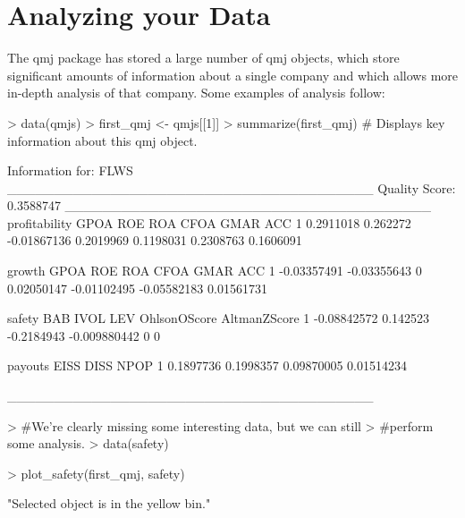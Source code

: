 \documentclass[titlepage]{article}
\begin{document}
\section*{Analyzing your Data}
The qmj package has stored a large number of qmj objects, which store significant amounts of information about a single company and which allows more in-depth analysis of that company. Some examples of analysis follow:
\begin{Schunk}
\begin{Sinput}
> data(qmjs)
> first_qmj <- qmjs[[1]]
> summarize(first_qmj) # Displays key information about this qmj object.
\end{Sinput}
\begin{Soutput}
Information for:  FLWS
_______________________________________
Quality Score:  0.3588747
_______________________________________
  profitability     GPOA         ROE       ROA      CFOA      GMAR       ACC
1     0.2911018 0.262272 -0.01867136 0.2019969 0.1198031 0.2308763 0.1606091


       growth        GPOA ROE        ROA        CFOA        GMAR        ACC
1 -0.03357491 -0.03355643   0 0.02050147 -0.01102495 -0.05582183 0.01561731


       safety      BAB       IVOL          LEV OhlsonOScore AltmanZScore
1 -0.08842572 0.142523 -0.2184943 -0.009880442            0            0


    payouts      EISS       DISS       NPOP
1 0.1897736 0.1998357 0.09870005 0.01514234

_______________________________________
\end{Soutput}
\begin{Sinput}
> #We're clearly missing some interesting data, but we can still 
> #perform some analysis.
> data(safety)
\end{Sinput}
\end{Schunk}
\begin{Schunk}
\begin{Sinput}
> plot_safety(first_qmj, safety)
\end{Sinput}
\begin{Soutput}
[1] "Selected object is in the yellow bin."
\end{Soutput}
\end{Schunk}
\end{document}
